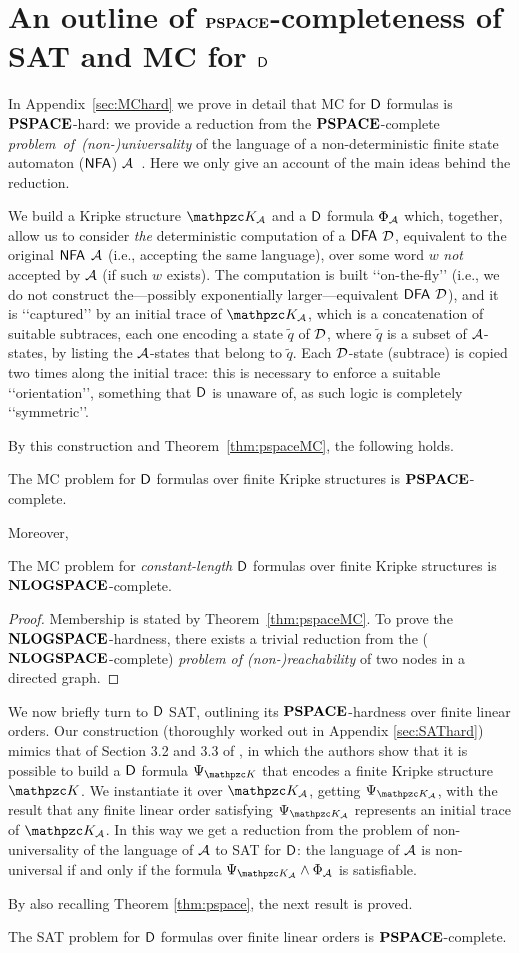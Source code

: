 \section{An outline of $\textbf{PSPACE}$-completeness of SAT \allowbreak and MC for $\mathsf{D}$}\label{sec:outlineSATMC}
In Appendix~\ref{sec:MChard} we prove in detail that MC for $\mathsf{D}$ formulas is $\textbf{PSPACE}$-hard: 
we provide a reduction from the $\textbf{PSPACE}$-complete \mbox{\emph{problem of (non-)universality}} of the language of a non-deterministic finite state automaton ($\text{\sffamily NFA}$) $\mathcal{A}$~\cite{holzer}.
Here we only give an account of the main ideas behind the reduction.

We build a Kripke structure $\Ku_\Au$ and a $\mathsf{D}$ formula $\Phi_{\mathcal{A}}$ which, together, allow us to consider \emph{the} deterministic computation of a $\text{\sffamily DFA}$ $\mathcal{D}$, equivalent to the original $\text{\sffamily NFA}$ $\mathcal{A}$ (i.e., accepting the same language), over some word $w$ \emph{not} accepted by $\mathcal{A}$ (if such $w$ exists). The computation is built \lq\lq on-the-fly\rq\rq{} (i.e., we do not construct the---possibly exponentially larger---equivalent $\text{\sffamily DFA}$ $\mathcal{D}$), and it is \lq\lq captured\rq\rq{} by an initial trace of $\Ku_\Au$, which is a concatenation of suitable subtraces, each one encoding a state $\tilde{q}$ of $\mathcal{D}$, where $\tilde{q}$ is a subset of  $\mathcal{A}$-states, by listing the $\mathcal{A}$-states that belong to $\tilde{q}$. Each $\mathcal{D}$-state (subtrace) is copied two times along the initial trace: this is necessary to enforce a suitable \lq\lq orientation\rq\rq, something that $\mathsf{D}${} is unaware of, as such logic is completely \lq\lq symmetric\rq\rq.

By this construction and Theorem~\ref{thm:pspaceMC}, the following holds.
\begin{theorem}
The MC problem for $\mathsf{D}$ formulas over finite Kripke structures is $\textbf{PSPACE}$-complete.
\end{theorem} 

Moreover,
\begin{theorem}
The MC problem for \emph{constant-length} $\mathsf{D}$ formulas over finite Kripke structures is $\textbf{NLOGSPACE}$-complete.
\end{theorem} 
\begin{proof}
Membership is stated by Theorem~\ref{thm:pspaceMC}.
To prove the $\textbf{NLOGSPACE}$-hardness, there exists a trivial reduction from the ($\textbf{NLOGSPACE}$-complete) \emph{problem of \mbox{(non-)reachability}} of two nodes in a directed graph.
\end{proof}

We now briefly turn to $\mathsf{D}$ SAT,
outlining its $\textbf{PSPACE}$-hardness over finite linear orders.
Our construction (thoroughly worked out in Appendix \ref{sec:SAThard}) mimics that of Section 3.2 and 3.3 of \cite{DBLP:journals/fuin/MarcinkowskiM14}, in which the authors show 
that it is possible to build a $\mathsf{D}$ formula $\Psi_{\Ku}$ that encodes a finite Kripke structure $\Ku$.
We instantiate it over $\Ku_\Au$, getting $\Psi_{\Ku_\Au}$, with the result that
any finite linear order satisfying $\Psi_{\Ku_\Au}$ represents an initial trace of $\Ku_\Au$.
In this way we get a reduction from the 
problem of non-universality of the language of $\mathcal{A}$ to SAT for $\mathsf{D}$:
the language of $\mathcal{A}$ is non-universal if and only if the formula $\Psi_{\Ku_\Au}\wedge\Phi_\Au$ is satisfiable.

By also recalling Theorem \ref{thm:pspace}, the next result is proved.
%
\begin{theorem}\label{cor:pspace_complete}
The SAT problem for $\mathsf{D}$ formulas over finite linear orders is $\textbf{PSPACE}$-complete.
\end{theorem}